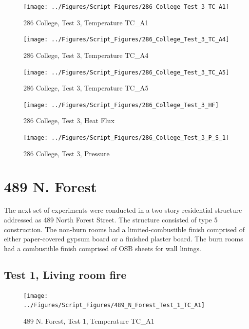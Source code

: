 \documentclass[12pt,oneside]{book}
\begin{document}
\begin{figure}[!ht]
\texttt{[image: ../Figures/Script\_Figures/286\_College\_Test\_3\_TC\_A1]}
\caption{286 College, Test 3, Temperature TC\_A1}
\label{fig:286_College_Test_3_TC_A1}
\end{figure}

\begin{figure}[!ht]
\texttt{[image: ../Figures/Script\_Figures/286\_College\_Test\_3\_TC\_A4]}
\caption{286 College, Test 3, Temperature TC\_A4}
\label{fig:286_College_Test_3_TC_A4}
\end{figure}

\begin{figure}[!ht]
\texttt{[image: ../Figures/Script\_Figures/286\_College\_Test\_3\_TC\_A5]}
\caption{286 College, Test 3, Temperature TC\_A5}
\label{fig:286_College_Test_3_TC_A5}
\end{figure}

\begin{figure}[!ht]
\texttt{[image: ../Figures/Script\_Figures/286\_College\_Test\_3\_HF]}
\caption{286 College, Test 3, Heat Flux}
\label{fig:286_College_Test_3_HF}
\end{figure}

\begin{figure}[!ht]
\texttt{[image: ../Figures/Script\_Figures/286\_College\_Test\_3\_P\_S\_1]}
\caption{286 College, Test 3, Pressure}
\label{fig:286_College_Test_3_P_S_1}
\end{figure}


\clearpage


\section{489 N. Forest}

The next set of experiments were conducted in a two story residential structure addressed as 489 North Forest Street. The structure consisted of type 5 construction. The non-burn rooms had a limited-combustible finish comprised of either paper-covered gypsum board or a finished plaster board. The burn rooms had a combustible finish comprised of OSB sheets for wall linings.

\subsection{Test 1, Living room fire}



\begin{figure}[!ht]
\texttt{[image: ../Figures/Script\_Figures/489\_N\_Forest\_Test\_1\_TC\_A1]}
\caption{489 N. Forest, Test 1, Temperature TC\_A1}
\label{fig:489_N_Forest_Test_1_TC_A1}
\end{figure}
\end{document}
